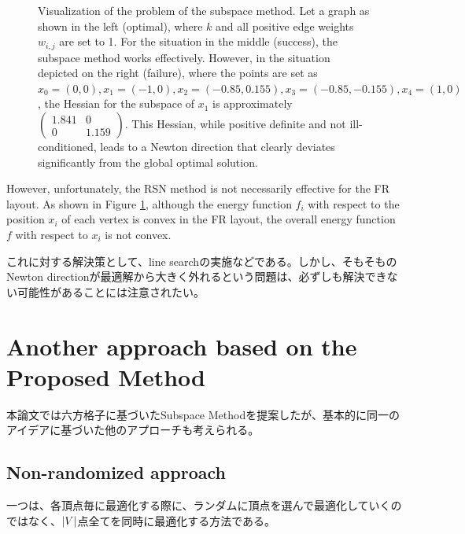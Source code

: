 \documentclass[dvipdfmx,lettersize,journal]{IEEEtran}
\begin{document}
\begin{figure}[t]
  \caption{
    Visualization of the problem of the subspace method.
    Let a graph as shown in the left (optimal), where $k$ and all positive edge weights $w_{i,j}$ are set to 1.
    For the situation in the middle (success), the subspace method works effectively.
    However, in the situation depicted on the right (failure),
    where the points are set as $x_0=(0,0), x_1=(-1,0), x_2=(-0.85,0.155), x_3=(-0.85,-0.155), x_4=(1,0)$,
    the Hessian for the subspace of $x_1$ is approximately
    $
      \begin{pmatrix} 1.841 & 0 \\ 0 & 1.159 \end{pmatrix}
    $.
    This Hessian, while positive definite and not ill-conditioned, leads to a Newton direction that clearly deviates significantly from the global optimal solution.
  }
  \label{fig:why_RSN_failed}
\end{figure}

However, unfortunately, the RSN method is not necessarily effective for the FR layout.
As shown in Figure \ref{fig:why_RSN_failed}, although the energy function \( f_i \) with respect to the position \( x_i \) of each vertex is convex in the FR layout, the overall energy function \( f \) with respect to \( x_i \) is not convex.

これに対する解決策として、line searchの実施などである。しかし、そもそものNewton directionが最適解から大きく外れるという問題は、必ずしも解決できない可能性があることには注意されたい。

\section{Another approach based on the Proposed Method}\label{sec:anotherApproach}

本論文では六方格子に基づいたSubspace Methodを提案したが、基本的に同一のアイデアに基づいた他のアプローチも考えられる。

\subsection{Non-randomized approach}\label{ssec:nonRandom}
一つは、各頂点毎に最適化する際に、ランダムに頂点を選んで最適化していくのではなく、$\abs{V}$点全てを同時に最適化する方法である。
\end{document}
